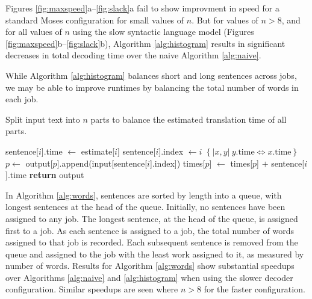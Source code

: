 \documentclass[11pt,letterpaper]{article}
\begin{document}
%
Figures \ref{fig:maxspeed}a--\ref{fig:slack}a fail to show improvment in speed for a standard Moses configuration for small values of $n$. But for values of $n>8$, and for all values of $n$ using the slow syntactic language model (Figures \ref{fig:maxspeed}b--\ref{fig:slack}b), Algorithm \ref{alg:histogram} results in significant decreases in total decoding time over the naive Algorithm \ref{alg:naive}.

While Algorithm \ref{alg:histogram} balances short and long sentences across jobs, we may be able to improve runtimes by 
balancing the total number of words in each job. 
%
\begin{algorithm}[!t]
\caption{Split input text into $n$ parts to balance the estimated translation time of all parts.}
\begin{algorithmic}
\State sentence[$i$].time $\gets$ estimate[$i$]
\State sentence[$i$].index $\gets i$
\EndFor
\State {} $\left\{|x,y|\ y.\mbox{time}\Leftrightarrow x.\mbox{time}\right\}$ 
\State {}
\State $p \gets$ 
\State {}
\State output[$p$].append(input[sentence[$i$].index])
\State times[$p$] $\gets$ times[$p$] $ + $ sentence[$i$].time
\EndFor
\State \textbf{return} output
\EndFunction
\end{algorithmic}
\label{alg:times}
\end{algorithm}
%
%
In Algorithm \ref{alg:words}, sentences are sorted by length into a queue, with longest sentences at the head of the queue.
%
Initially, no sentences have been assigned to any job.
%
The longest sentence, at the head of the queue, is assigned first to a job. As each sentence is assigned to a job, the total number of words assigned to that job is recorded. 
%
Each subsequent sentence is removed from the queue and assigned to the job with 
%
%
the least work assigned to it, as measured by number 
%
of words.
%
Results for Algorithm \ref{alg:words} show substantial speedups over Algorithms \ref{alg:naive} and \ref{alg:histogram} when using the slower decoder configuration. Similar speedups are seen where $n>8$ for the faster configuration.
\end{document}
